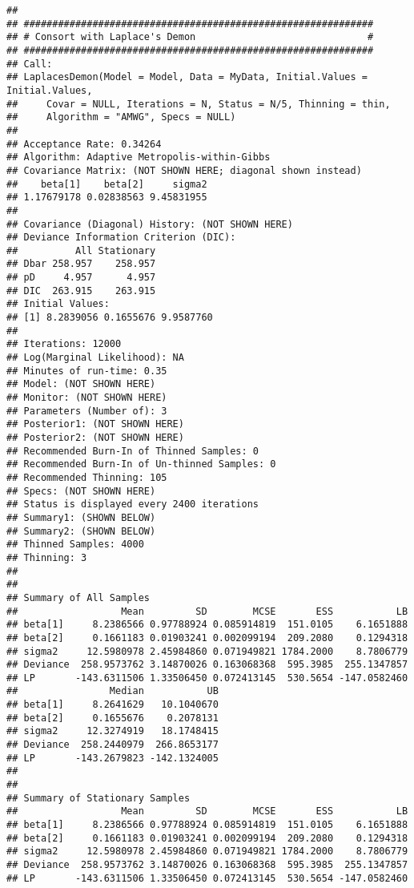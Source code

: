 \documentclass[
]{book}
\begin{document}
\begin{verbatim}
## 
## #############################################################
## # Consort with Laplace's Demon                              #
## #############################################################
## Call:
## LaplacesDemon(Model = Model, Data = MyData, Initial.Values = Initial.Values, 
##     Covar = NULL, Iterations = N, Status = N/5, Thinning = thin, 
##     Algorithm = "AMWG", Specs = NULL)
## 
## Acceptance Rate: 0.34264
## Algorithm: Adaptive Metropolis-within-Gibbs
## Covariance Matrix: (NOT SHOWN HERE; diagonal shown instead)
##    beta[1]    beta[2]     sigma2 
## 1.17679178 0.02838563 9.45831955 
## 
## Covariance (Diagonal) History: (NOT SHOWN HERE)
## Deviance Information Criterion (DIC):
##          All Stationary
## Dbar 258.957    258.957
## pD     4.957      4.957
## DIC  263.915    263.915
## Initial Values:
## [1] 8.2839056 0.1655676 9.9587760
## 
## Iterations: 12000
## Log(Marginal Likelihood): NA
## Minutes of run-time: 0.35
## Model: (NOT SHOWN HERE)
## Monitor: (NOT SHOWN HERE)
## Parameters (Number of): 3
## Posterior1: (NOT SHOWN HERE)
## Posterior2: (NOT SHOWN HERE)
## Recommended Burn-In of Thinned Samples: 0
## Recommended Burn-In of Un-thinned Samples: 0
## Recommended Thinning: 105
## Specs: (NOT SHOWN HERE)
## Status is displayed every 2400 iterations
## Summary1: (SHOWN BELOW)
## Summary2: (SHOWN BELOW)
## Thinned Samples: 4000
## Thinning: 3
## 
## 
## Summary of All Samples
##                  Mean         SD        MCSE       ESS           LB
## beta[1]     8.2386566 0.97788924 0.085914819  151.0105    6.1651888
## beta[2]     0.1661183 0.01903241 0.002099194  209.2080    0.1294318
## sigma2     12.5980978 2.45984860 0.071949821 1784.2000    8.7806779
## Deviance  258.9573762 3.14870026 0.163068368  595.3985  255.1347857
## LP       -143.6311506 1.33506450 0.072413145  530.5654 -147.0582460
##                Median           UB
## beta[1]     8.2641629   10.1040670
## beta[2]     0.1655676    0.2078131
## sigma2     12.3274919   18.1748415
## Deviance  258.2440979  266.8653177
## LP       -143.2679823 -142.1324005
## 
## 
## Summary of Stationary Samples
##                  Mean         SD        MCSE       ESS           LB
## beta[1]     8.2386566 0.97788924 0.085914819  151.0105    6.1651888
## beta[2]     0.1661183 0.01903241 0.002099194  209.2080    0.1294318
## sigma2     12.5980978 2.45984860 0.071949821 1784.2000    8.7806779
## Deviance  258.9573762 3.14870026 0.163068368  595.3985  255.1347857
## LP       -143.6311506 1.33506450 0.072413145  530.5654 -147.0582460

\end{verbatim}
\end{document}
